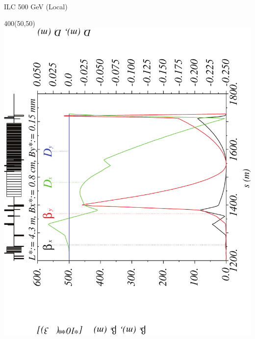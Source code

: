 \documentclass{beamer}
\begin{document}
\begin{frame}{ILC 500 GeV (Local)}
  \setlength{\TPHorizModule}{1pt}
  \setlength{\TPVertModule}{1pt}
 \begin{textblock}{400}(50,50)
 \includegraphics[scale=0.4,angle=-90]{ILClocal_etax-crop.pdf}
 \end{textblock}
\end{frame}
\end{document}
